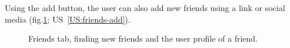 Using the add button, the user can also add new friends using a link or social media (fig.\ref{fig:friends}; US~\ref{US:friends-add}).

\begin{figure}[h!]
    \centering
    \hfill
    \hfill
    \caption{Friends tab, finding new friends and the user profile of a friend.}
    \label{fig:friends}
\end{figure}

